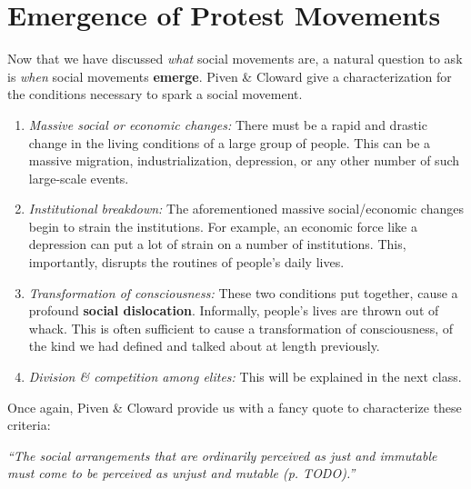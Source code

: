 \section{Emergence of Protest Movements}
Now that we have discussed \textit{what} social movements are, a natural question to ask is \textit{when} social movements \textbf{emerge}.
Piven \& Cloward give a characterization for the conditions necessary to spark a social movement.

\begin{enumerate}
    \item \textit{Massive social or economic changes:}
    There must be a rapid and drastic change in the living conditions of a large group of people.
    This can be a massive migration, industrialization, depression, or any other number of such large-scale events.
    \item \textit{Institutional breakdown:}
    The aforementioned massive social/economic changes begin to strain the institutions.
    For example, an economic force like a depression can put a lot of strain on a number of institutions.
    This, importantly, disrupts the routines of people's daily lives.
    \item \textit{Transformation of consciousness:} 
    These two conditions put together, cause a profound \textbf{social dislocation}.
    Informally, people's lives are thrown out of whack.
    This is often sufficient to cause a transformation of consciousness, of the kind we had defined and talked about at length previously.
    \item \textit{Division \& competition among elites:}
    This will be explained in the next class.
\end{enumerate}
Once again, Piven \& Cloward provide us with a fancy quote to characterize these criteria:
\begin{center}
\textit{``The social arrangements that are ordinarily perceived as just and immutable must come to be perceived as unjust and mutable (p. TODO).''}
\end{center}
